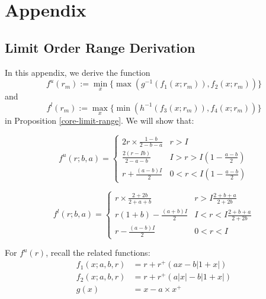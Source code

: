 \documentclass[notitlepage,reqno,11pt]{amsart}
\numberwithin{equation}{section}
\begin{document}



\section{Appendix}

\subsection{Limit Order Range Derivation}\label{limit-range}
In this appendix, we derive the function 
$$f^u(r_m) := \min_x\{\max(g^{-1}(f_1(x;r_m)), f_2(x;r_m))\}$$ 
and 
$$f^l(r_m) := \max_x\{\min(h^{-1}(f_3(x;r_m)), f_4(x;r_m))\}$$ 
in Proposition \ref{core-limit-range}. We will show that:

\begin{equation*}
f^u(r; b,a) =
\begin{cases}
  2r\times\frac{1-b}{2-b-a} & r > I \\
  \frac{2(r-Ib)}{2-a-b} & I > r > I(1-\frac{a-b}{2}) \\
  r + \frac{(a-b)I}{2} & 0 < r <I(1-\frac{a-b}{2})
\end{cases}
\end{equation*}

\begin{equation*}
f^l(r; b,a) =
\begin{cases}
  r\times\frac{2+2b}{2+a+b} & r > I\frac{2+b+a}{2+2b} \\
  r(1+b) - \frac{(a+b)I}{2} & I < r < I\frac{2+b+a}{2+2b} \\
  r - \frac{(a-b)I}{2} & 0 < r <I
\end{cases}
\end{equation*}

For $f^u(r)$, recall the related functions:
\begin{align*}
    f_1(x;a,b,r) &= r + r^+(a x - b|1+x|)\\
    f_2(x;a,b,r) &= r + r^+(a|x| - b|1+x|)\\
    g(x) &= x - a\times x^+
\end{align*}
\end{document}
